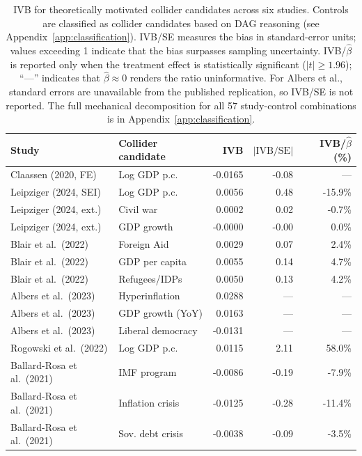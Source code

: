 \documentclass[
]{article}
\begin{document}
\begin{table}[!h]
\centering
\caption{\label{tab:ivb-summary-table}IVB for theoretically motivated collider candidates across six studies. Controls are classified as collider candidates based on DAG reasoning (see Appendix~\ref{app:classification}). IVB/SE measures the bias in standard-error units; values exceeding 1 indicate that the bias surpasses sampling uncertainty. IVB/$\hat\beta$ is reported only when the treatment effect is statistically significant ($|t| \geq 1.96$); ``---'' indicates that $\hat\beta \approx 0$ renders the ratio uninformative. For Albers et al., standard errors are unavailable from the published replication, so IVB/SE is not reported. The full mechanical decomposition for all 57 study-control combinations is in Appendix~\ref{app:classification}. \label{tab:ivb_summary}}
\centering
\begin{tabular}[t]{llrrr}
\toprule
Study & Collider candidate & IVB & $\lvert\text{IVB}/\text{SE}\rvert$ & IVB/$\hat\beta$ (\%)\\
\midrule
Claassen (2020, FE) & Log GDP p.c. & -0.0165 & -0.08 & ---\\
Leipziger (2024, SEI) & Log GDP p.c. & 0.0056 & 0.48 & -15.9\%\\
Leipziger (2024, ext.) & Civil war & 0.0002 & 0.02 & -0.7\%\\
Leipziger (2024, ext.) & GDP growth & -0.0000 & -0.00 & 0.0\%\\
Blair et al.\ (2022) & Foreign Aid & 0.0029 & 0.07 & 2.4\%\\
\addlinespace
Blair et al.\ (2022) & GDP per capita & 0.0055 & 0.14 & 4.7\%\\
Blair et al.\ (2022) & Refugees/IDPs & 0.0050 & 0.13 & 4.2\%\\
Albers et al.\ (2023) & Hyperinflation & 0.0288 & --- & ---\\
Albers et al.\ (2023) & GDP growth (YoY) & 0.0163 & --- & ---\\
Albers et al.\ (2023) & Liberal democracy & -0.0131 & --- & ---\\
\addlinespace
Rogowski et al.\ (2022) & Log GDP p.c. & 0.0115 & 2.11 & 58.0\%\\
Ballard-Rosa et al.\ (2021) & IMF program & -0.0086 & -0.19 & -7.9\%\\
Ballard-Rosa et al.\ (2021) & Inflation crisis & -0.0125 & -0.28 & -11.4\%\\
Ballard-Rosa et al.\ (2021) & Sov. debt crisis & -0.0038 & -0.09 & -3.5\%\\
\bottomrule
\end{tabular}
\end{table}
\end{document}

